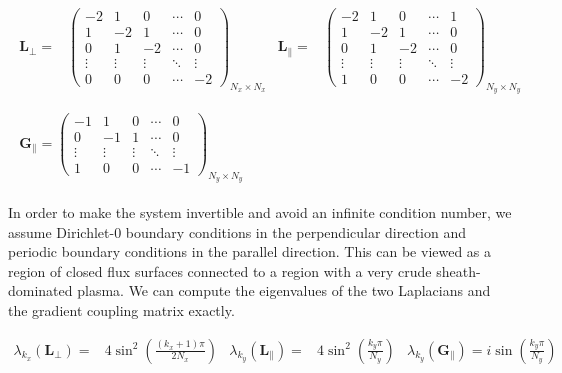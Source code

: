 \begin{gather}
	\begin{aligned}
	\mathbf{L}_\perp =& \begin{pmatrix}
		-2 & 1 & 0 & \cdots & 0 \\
		1 & -2 & 1 & \cdots & 0 \\
		0 & 1 & -2 & \cdots & 0 \\
		\vdots & \vdots & \vdots & \ddots & \vdots \\
		0 & 0 & 0 & \cdots & -2
	\end{pmatrix}_{N_x \times N_x} &
	\mathbf{L}_\parallel =& \begin{pmatrix}
		-2 & 1 & 0 & \cdots & 1 \\
		1 & -2 & 1 & \cdots & 0 \\
		0 & 1 & -2 & \cdots & 0 \\
		\vdots & \vdots & \vdots & \ddots & \vdots \\
		1 & 0 & 0 & \cdots & -2
	\end{pmatrix}_{N_y \times N_y} \nonumber\\
	\end{aligned} \\
	\begin{aligned}
	\mathbf{G}_\parallel = \begin{pmatrix}
		-1 & 1 & 0 & \cdots & 0 \\
		0 & -1 & 1 & \cdots & 0 \\
		\vdots & \vdots & \vdots & \ddots & \vdots \\
		1 & 0 & 0 & \cdots & -1
	\end{pmatrix}_{N_y \times N_y}
	\end{aligned}
\end{gather}

In order to make the system invertible and avoid an infinite condition number, we assume Dirichlet-0 boundary conditions in the perpendicular direction and periodic boundary conditions in the parallel direction. This can be viewed as a region of closed flux surfaces connected to a region with a very crude sheath-dominated plasma. We can compute the eigenvalues of the two Laplacians and the gradient coupling matrix exactly.

\begin{align}
	\lambda_{k_x}(\mathbf{L}_\perp) =& 4\sin^2\left(\frac{(k_x+1)\pi}{2N_x}\right)  & \lambda_{k_y}(\mathbf{L}_\parallel) =& 4\sin^2\left(\frac{k_y\pi}{N_y}\right) & \lambda_{k_y}(\mathbf{G}_\parallel) = i\sin\left(\frac{k_y\pi}{N_y}\right)
\end{align}

